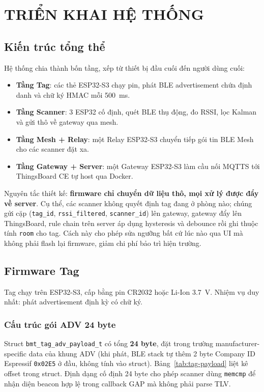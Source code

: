 \chapter{TRIỂN KHAI HỆ THỐNG}
\label{Chapter4}

\section{Kiến trúc tổng thể}

Hệ thống chia thành bốn tầng, xếp từ thiết bị đầu cuối đến người dùng cuối:

\begin{itemize}
    \item \textbf{Tầng Tag}: các thẻ ESP32-S3 chạy pin, phát BLE advertisement chứa định danh và chữ ký HMAC mỗi 500~ms.
    \item \textbf{Tầng Scanner}: 3 ESP32 cố định, quét BLE thụ động, đo RSSI, lọc Kalman và gửi thô về gateway qua mesh.
    \item \textbf{Tầng Mesh + Relay}: một Relay ESP32-S3 chuyển tiếp gói tin BLE Mesh cho các scanner đặt xa.
    \item \textbf{Tầng Gateway + Server}: một Gateway ESP32-S3 làm cầu nối MQTTS tới ThingsBoard CE tự host qua Docker.
\end{itemize}

Nguyên tắc thiết kế: \textbf{firmware chỉ chuyển dữ liệu thô, mọi xử lý được đẩy về server}. Cụ thể, các scanner không quyết định tag đang ở phòng nào; chúng gửi cặp (\texttt{tag\_id}, \texttt{rssi\_filtered}, \texttt{scanner\_id}) lên gateway, gateway đẩy lên ThingsBoard, rule chain trên server áp dụng hysteresis và debounce rồi ghi thuộc tính \texttt{room} cho tag. Cách này cho phép sửa ngưỡng bất cứ lúc nào qua UI mà không phải flash lại firmware, giảm chi phí bảo trì hiện trường.

\section{Firmware Tag}

Tag chạy trên ESP32-S3, cấp bằng pin CR2032 hoặc Li-Ion 3.7~V. Nhiệm vụ duy nhất: phát advertisement định kỳ có chữ ký.

\subsection{Cấu trúc gói ADV 24 byte}

Struct \texttt{bmt\_tag\_adv\_payload\_t} có tổng \textbf{24 byte}, đặt trong trường manufacturer-specific data của khung ADV (khi phát, BLE stack tự thêm 2 byte Company ID Espressif \texttt{0x02E5} ở đầu, không tính vào struct). Bảng~\ref{tab:tag-payload} liệt kê offset trong struct. Định dạng cố định 24 byte cho phép scanner dùng \texttt{memcmp} để nhận diện beacon hợp lệ trong callback GAP mà không phải parse TLV.

